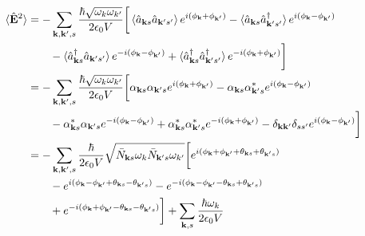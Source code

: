 \documentclass[../../../main.tex]{subfiles}
\begin{document}
\begin{align*}
  \braket{\hat{\mathbf{E}}^2 }
   & =   - \sum_{\mathbf{k},\mathbf{k}', s} \frac{\hbar \sqrt{\omega_k \omega_{k'}}}{2 \epsilon_0 V}
  \bigg[ \braket{\hat{a}_{\mathbf{k }s} \hat{a}_{\mathbf{k }'s'} }  e ^{i(\phi_{\mathbf{k }} +\phi_{\mathbf{k }'})}
  -\braket{\hat{a}_{\mathbf{k }s} \hat{a}^\dagger_{\mathbf{k }'s'}  } e ^{i(\phi_{\mathbf{k }}-\phi_{\mathbf{k }'})}                                                                                     \\
   & \qquad-\braket{\hat{a}^\dagger_{\mathbf{k }s} \hat{a}_{\mathbf{k }'s'} } e ^{-i(\phi_{\mathbf{k }}-\phi_{\mathbf{k }'})}
  +\braket{\hat{a}^\dagger_{\mathbf{k }s} \hat{a}^\dagger_{\mathbf{k }'s'} } e ^{-i(\phi_{\mathbf{k }}+\phi_{\mathbf{k }'})} \bigg]                                                                      \\
   & =   - \sum_{\mathbf{k},\mathbf{k}',s} \frac{\hbar \sqrt{\omega_k \omega_{k'}}}{2 \epsilon_0 V}
  \bigg[ \alpha_{\mathbf{k}s} \alpha_{\mathbf{k }' s}e ^{i(\phi_{\mathbf{k }} +\phi_{\mathbf{k }'})}
  -\alpha_{\mathbf{k }s }\alpha_{\mathbf{k' } s }^* e ^{i(\phi_{\mathbf{k }}-\phi_{\mathbf{k }'})}                                                                                                       \\
   & \qquad-\alpha_{\mathbf{k } s}^*\alpha_{\mathbf{k' } s} e ^{-i(\phi_{\mathbf{k }}-\phi_{\mathbf{k }'})}
  +\alpha_{\mathbf{k } s } ^*\alpha_{\mathbf{k' } s}^* e ^{-i(\phi_{\mathbf{k }}+\phi_{\mathbf{k }'})} -\delta_{\mathbf{k }\mathbf{k}'}\delta_{ss'}e ^{i(\phi_{\mathbf{k }}-\phi_{\mathbf{k }'})} \bigg] \\
   & =   - \sum_{\mathbf{k},\mathbf{k}',s} \frac{\hbar }{2 \epsilon_0 V}\sqrt{\bar{N}_{\mathbf{k }s}\omega_k \bar{N}_{\mathbf{k}' s}\omega_{k'}}
  \bigg[ e ^{i(\phi_{\mathbf{k }} +\phi_{\mathbf{k }'}+\theta_{\mathbf{k }s}+\theta_{\mathbf{k }'s})}                                                                                                    \\
   & \qquad -e ^{i(\phi_{\mathbf{k }}-\phi_{\mathbf{k }'} +\theta_{\mathbf{k }s}-\theta_{\mathbf{k }' s})}
  -e ^{-i(\phi_{\mathbf{k }}-\phi_{\mathbf{k }'}-\theta_{\mathbf{k }s}+\theta_{\mathbf{k }' s})}                                                                                                         \\
   & \qquad + e ^{-i(\phi_{\mathbf{k }}+\phi_{\mathbf{k }'}-\theta_{\mathbf{k }s}-\theta_{\mathbf{k }'s})} \bigg]+ \sum_{\mathbf{k },s}\frac{\hbar \omega_k }{2\epsilon_0 V}                             \\

\end{align*}
\end{document}
